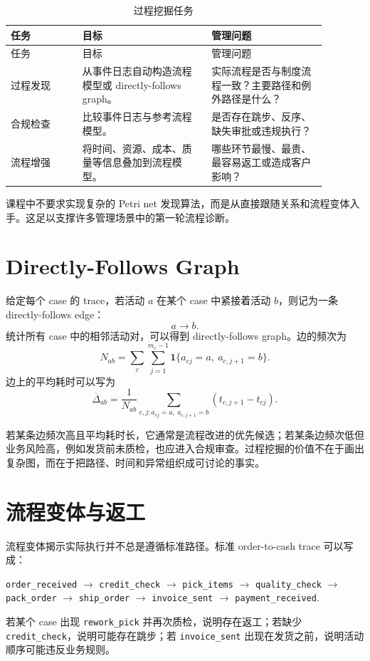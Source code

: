 \documentclass[UTF8,fontset=fandol,openany,zihao=-4]{ctexbook}
\begin{document}
\begin{longtable}{>{\raggedright\arraybackslash}p{0.20\linewidth}>{\raggedright\arraybackslash}p{0.36\linewidth}>{\raggedright\arraybackslash}p{0.32\linewidth}}
\caption{过程挖掘任务}\\
\toprule
任务 & 目标 & 管理问题\\
\midrule
\endfirsthead
\toprule
任务 & 目标 & 管理问题\\
\midrule
\endhead
过程发现 & 从事件日志自动构造流程模型或 directly-follows graph。 & 实际流程是否与制度流程一致？主要路径和例外路径是什么？\\
合规检查 & 比较事件日志与参考流程模型。 & 是否存在跳步、反序、缺失审批或违规执行？\\
流程增强 & 将时间、资源、成本、质量等信息叠加到流程模型。 & 哪些环节最慢、最贵、最容易返工或造成客户影响？\\
\bottomrule
\end{longtable}

课程中不要求实现复杂的 Petri net 发现算法，而是从直接跟随关系和流程变体入手。这足以支撑许多管理场景中的第一轮流程诊断。

\section{Directly-Follows Graph}

给定每个 case 的 trace，若活动 \(a\) 在某个 case 中紧接着活动 \(b\)，则记为一条 directly-follows edge：
\[
  a \rightarrow b.
\]
统计所有 case 中的相邻活动对，可以得到 directly-follows graph。边的频次为
\[
  N_{ab}
  =
  \sum_c\sum_{j=1}^{m_c-1}
  \mathbf 1\{a_{cj}=a,\ a_{c,j+1}=b\}.
\]
边上的平均耗时可以写为
\[
  \overline{\Delta}_{ab}
  =
  \frac{1}{N_{ab}}
  \sum_{c,j:a_{cj}=a,\ a_{c,j+1}=b}
  (t_{c,j+1}-t_{cj}).
\]

若某条边频次高且平均耗时长，它通常是流程改进的优先候选；若某条边频次低但业务风险高，例如发货前未质检，也应进入合规审查。过程挖掘的价值不在于画出复杂图，而在于把路径、时间和异常组织成可讨论的事实。

\section{流程变体与返工}

流程变体揭示实际执行并不总是遵循标准路径。标准 order-to-cash trace 可以写成：
\begin{center}
\texttt{order\_received} \(\rightarrow\)
\texttt{credit\_check} \(\rightarrow\)
\texttt{pick\_items} \(\rightarrow\)
\texttt{quality\_check} \(\rightarrow\)
\texttt{pack\_order} \(\rightarrow\)
\texttt{ship\_order} \(\rightarrow\)
\texttt{invoice\_sent} \(\rightarrow\)
\texttt{payment\_received}.
\end{center}
若某个 case 出现 \texttt{rework\_pick} 并再次质检，说明存在返工；若缺少 \texttt{credit\_check}，说明可能存在跳步；若 \texttt{invoice\_sent} 出现在发货之前，说明活动顺序可能违反业务规则。
\end{document}
